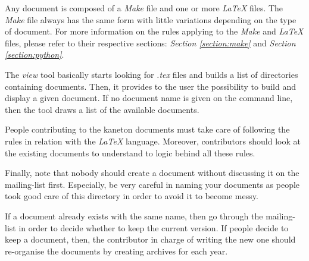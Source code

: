 Any document is composed of a \textit{Make} file and one or more
\textit{\LaTeX} files. The \textit{Make} file always has the same form
with little variations depending on the type of document. For more information
on the rules applying to the \textit{Make} and \textit{\LaTeX} files, please
refer to their respective sections: \textit{Section \ref{section:make}}
and \textit{Section \ref{section:python}}.

The \textit{view} tool basically starts looking for \textit{.tex} files
and builds a list of directories containing documents. Then, it provides
to the user the possibility to build and display a given document. If no
document name is given on the command line, then the tool draws a list
of the available documents.

People contributing to the kaneton documents must take care of following
the rules in relation with the \textit{\LaTeX} language. Moreover, contributors
should look at the existing documents to understand to logic behind all
these rules.

Finally, note that nobody should create a document without discussing it
on the mailing-list first. Especially, be very careful in naming your
documents as people took good care of this directory in order to avoid
it to become messy.

If a document already exists with the same name, then go through the
mailing-list in order to decide whether to keep the current version. If
people decide to keep a document, then, the contributor in charge of writing
the new one should re-organise the documents by creating archives for
each year.
